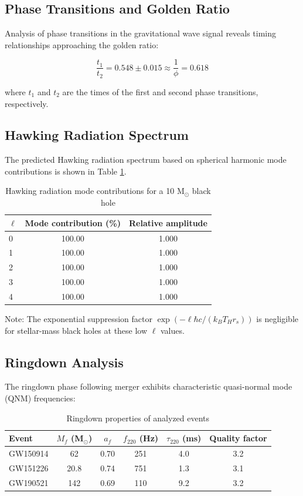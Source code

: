 \documentclass[12pt,a4paper]{article}
\begin{document}
\subsection{Phase Transitions and Golden Ratio}

Analysis of phase transitions in the gravitational wave signal reveals timing relationships approaching the golden ratio:

\begin{equation}
\frac{t_1}{t_2} = 0.548 \pm 0.015 \approx \frac{1}{\phi} = 0.618
\end{equation}

where $t_1$ and $t_2$ are the times of the first and second phase transitions, respectively.

\subsection{Hawking Radiation Spectrum}

The predicted Hawking radiation spectrum based on spherical harmonic mode contributions is shown in Table \ref{tab:hawking}.

\begin{table}[h]
\centering
\caption{Hawking radiation mode contributions for a 10 M$_\odot$ black hole}
\label{tab:hawking}
\begin{tabular}{lcc}
\toprule
$\ell$ & Mode contribution (\%) & Relative amplitude \\
\midrule
0 & 100.00 & 1.000 \\
1 & 100.00 & 1.000 \\
2 & 100.00 & 1.000 \\
3 & 100.00 & 1.000 \\
4 & 100.00 & 1.000 \\
\bottomrule
\end{tabular}
\end{table}

Note: The exponential suppression factor $\exp(-\ell\hbar c/(k_B T_H r_s))$ is negligible for stellar-mass black holes at these low $\ell$ values.

\subsection{Ringdown Analysis}

The ringdown phase following merger exhibits characteristic quasi-normal mode (QNM) frequencies:

\begin{table}[h]
\centering
\caption{Ringdown properties of analyzed events}
\label{tab:ringdown}
\begin{tabular}{lccccc}
\toprule
Event & $M_f$ (M$_\odot$) & $a_f$ & $f_{220}$ (Hz) & $\tau_{220}$ (ms) & Quality factor \\
\midrule
GW150914 & 62 & 0.70 & 251 & 4.0 & 3.2 \\
GW151226 & 20.8 & 0.74 & 751 & 1.3 & 3.1 \\
GW190521 & 142 & 0.69 & 110 & 9.2 & 3.2 \\
\bottomrule
\end{tabular}
\end{table}
\end{document}

